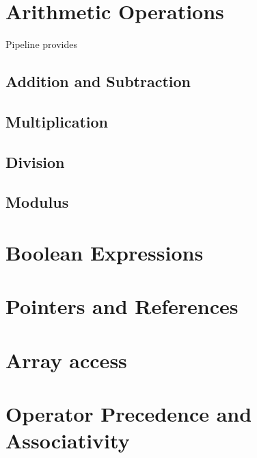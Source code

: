 \documentclass[./LRM_main.tex]{subfiles}
\begin{document}
\section{Arithmetic Operations}
Pipeline provides 
\subsection{Addition and Subtraction}
\subsection{Multiplication}
\subsection{Division}
\subsection{Modulus}
\section{Boolean Expressions}
\section{Pointers and References}
\section{Array access}
\section{Operator Precedence and Associativity}


\end{document}
